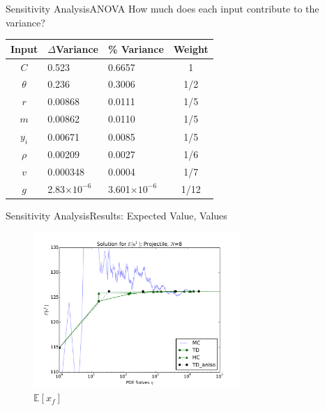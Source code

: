 \documentclass{beamer}
\newcommand{\expv}[1]{\ensuremath{\mathbb{E}[ #1]}}
\begin{document}
\begin{frame}[label=sens_res]{Sensitivity Analysis}{ANOVA}
How much does each input contribute to the variance?
\begin{table}
\centering
  \begin{tabular}{c|l|l|c}
    Input & $\Delta$Variance & \% Variance & Weight\\ \hline
    $C$ & 0.523 & 0.6657 & 1\\
    $\theta$ & 0.236 & 0.3006 & 1/2\\
    $r$ & 0.00868 & 0.0111 & 1/5\\
    $m$ & 0.00862 & 0.0110 & 1/5\\
    $y_i$ & 0.00671 & 0.0085 & 1/5\\
    $\rho$ & 0.00209 & 0.0027 & 1/6\\
    $v$ & 0.000348 & 0.0004 & 1/7\\
    $g$ & 2.83$\times10^{-6}$ & 3.601$\times10^{-6}$ & 1/12
  \end{tabular}
\end{table}
\begin{center}\hyperlink{unc_sum}{}\end{center}
\end{frame}

\begin{frame}{Sensitivity Analysis}{Results: Expected Value, Values}
  \begin{figure}[h!]
    \centering
      \includegraphics[width=0.7\textwidth]{../graphics/projectile_solns_aniso}
      \caption{$\expv{x_f}$}
  \end{figure}
\end{frame}
\end{document}
